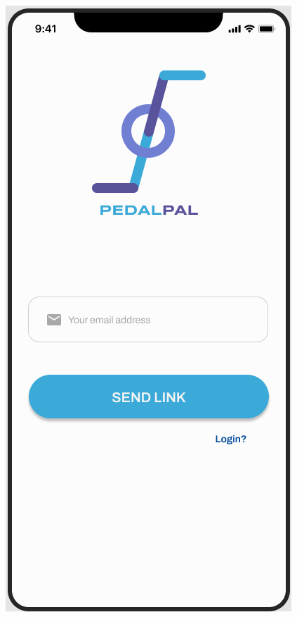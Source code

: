 \begin{figure}[h]
    \includegraphics[scale=0.35]{ui-images/EmailOTP.png}
    \hspace{20pt}

\end{figure}
